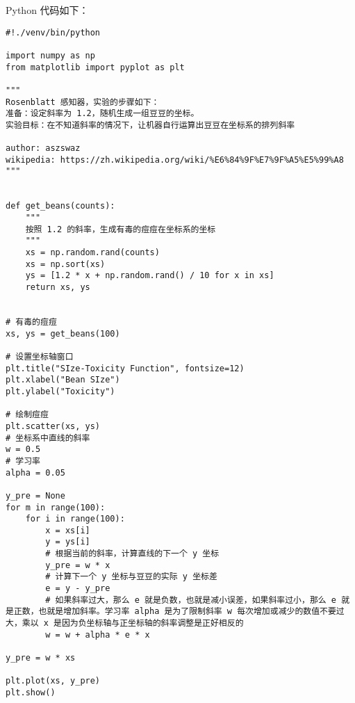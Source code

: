 \documentclass{ctexart}
\begin{document}
Python 代码如下：
\begin{lstlisting}
#!./venv/bin/python

import numpy as np
from matplotlib import pyplot as plt

"""
Rosenblatt 感知器，实验的步骤如下：
准备：设定斜率为 1.2，随机生成一组豆豆的坐标。
实验目标：在不知道斜率的情况下，让机器自行运算出豆豆在坐标系的排列斜率

author: aszswaz
wikipedia: https://zh.wikipedia.org/wiki/%E6%84%9F%E7%9F%A5%E5%99%A8
"""


def get_beans(counts):
    """
    按照 1.2 的斜率，生成有毒的痘痘在坐标系的坐标
    """
    xs = np.random.rand(counts)
    xs = np.sort(xs)
    ys = [1.2 * x + np.random.rand() / 10 for x in xs]
    return xs, ys


# 有毒的痘痘
xs, ys = get_beans(100)

# 设置坐标轴窗口
plt.title("SIze-Toxicity Function", fontsize=12)
plt.xlabel("Bean SIze")
plt.ylabel("Toxicity")

# 绘制痘痘
plt.scatter(xs, ys)
# 坐标系中直线的斜率
w = 0.5
# 学习率
alpha = 0.05

y_pre = None
for m in range(100):
    for i in range(100):
        x = xs[i]
        y = ys[i]
        # 根据当前的斜率，计算直线的下一个 y 坐标
        y_pre = w * x
        # 计算下一个 y 坐标与豆豆的实际 y 坐标差
        e = y - y_pre
        # 如果斜率过大，那么 e 就是负数，也就是减小误差，如果斜率过小，那么 e 就是正数，也就是增加斜率。学习率 alpha 是为了限制斜率 w 每次增加或减少的数值不要过大，乘以 x 是因为负坐标轴与正坐标轴的斜率调整是正好相反的
        w = w + alpha * e * x

y_pre = w * xs

plt.plot(xs, y_pre)
plt.show()
\end{lstlisting}
\end{document}
